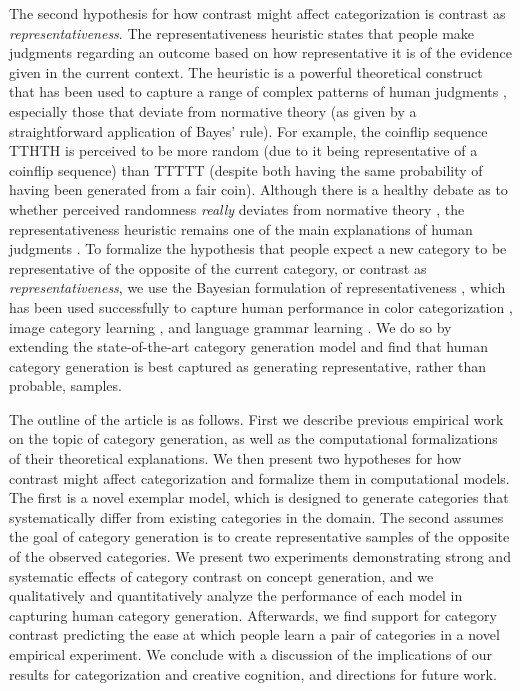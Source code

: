 \documentclass[12pt]{article}
\begin{document}
\begin{flushleft}
The second hypothesis for how contrast might affect categorization is contrast
as {\em representativeness}. The representativeness heuristic \citep{kahneman73}
states that people make judgments regarding an outcome based on how
representative it is of the evidence given in the current context. The heuristic
is a powerful theoretical construct that has been used to capture a range of
complex patterns of human judgments \citep{kahneman73,tversky74,tversky83},
especially those that deviate from normative theory (as given by a
straightforward application of Bayes' rule). For example, the coinflip sequence
TTHTH is perceived to be more random (due to it being representative of a
coinflip sequence) than TTTTT (despite both having the same probability of
having been generated from a fair coin). Although there is a healthy debate as
to whether perceived randomness {\em really} deviates from normative theory
\citep{griffiths18,hahn09}, the representativeness heuristic remains one of the
main explanations of human judgments \citep{reimers18}. To formalize the
hypothesis that people expect a new category to be representative of the
opposite of the current category, or contrast as {\em representativeness}, we
use the Bayesian formulation of representativeness \citep{tenenbaum01}, which
has been used successfully to capture human performance in color categorization
\citep{abbott16}, image category learning \citep{abbott11}, and language grammar
learning \citep{rafferty10}. We do so by extending the state-of-the-art category
generation model \citep{jern2013probabilistic} and find that human category
generation is best captured as generating representative, rather than probable,
samples.

The outline of the article is as follows. First we describe previous empirical
work on the topic of category generation, as well as the computational
formalizations of their theoretical explanations. We then present two hypotheses
for how contrast might affect categorization and formalize them in computational
models. The first is a novel exemplar model, which is designed to generate
categories that systematically differ from existing categories in the domain.
The second assumes the goal of category generation is to create representative
samples of the opposite of the observed categories. We present two experiments
demonstrating strong and systematic effects of category contrast on concept
generation, and we qualitatively and quantitatively analyze the performance of
each model in capturing human category generation. Afterwards, we find support
for category contrast predicting the ease at which people learn a pair of 
categories in a novel empirical experiment. We conclude with a discussion of the
implications of our results for categorization and creative cognition, and
directions for future work.


\end{flushleft}
\end{document}
